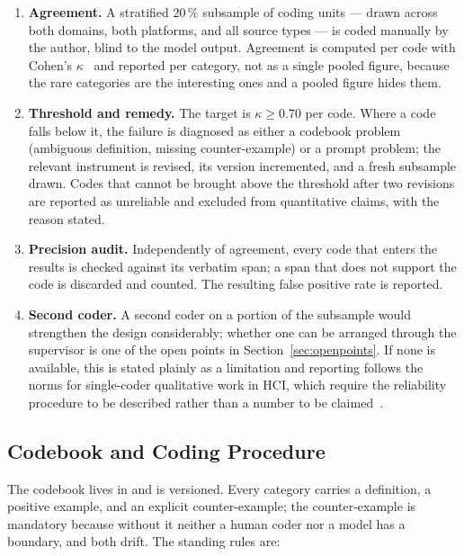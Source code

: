 \begin{enumerate}[leftmargin=*,itemsep=3pt]
  \item \textbf{Agreement.} A stratified 20\,\% subsample of coding units ---
        drawn across both domains, both platforms, and all source types --- is
        coded manually by the author, blind to the model output. Agreement is
        computed per code with Cohen's $\kappa$~\parencite{cohen1960coefficient}
        and reported per category, not as a single pooled figure, because the
        rare categories are the interesting ones and a pooled figure hides them.
  \item \textbf{Threshold and remedy.} The target is $\kappa \geq 0.70$ per
        code. Where a code falls below it, the failure is diagnosed as either a
        codebook problem (ambiguous definition, missing counter-example) or a
        prompt problem; the relevant instrument is revised, its version
        incremented, and a fresh subsample drawn. Codes that cannot be brought
        above the threshold after two revisions are reported as unreliable and
        excluded from quantitative claims, with the reason stated.
  \item \textbf{Precision audit.} Independently of agreement, every code that
        enters the results is checked against its verbatim span; a span that
        does not support the code is discarded and counted. The resulting false
        positive rate is reported.
  \item \textbf{Second coder.} A second coder on a portion of the subsample
        would strengthen the design considerably; whether one can be arranged
        through the supervisor is one of the open points in
        Section~\ref{sec:openpoints}. If none is available, this is stated
        plainly as a limitation and reporting follows the norms for
        single-coder qualitative work in HCI, which require the reliability
        procedure to be described rather than a number to be
        claimed~\parencite{mcdonald2019reliability}.
\end{enumerate}

\subsection{Codebook and Coding Procedure}

The codebook lives in  and is versioned. Every
category carries a definition, a positive example, and an explicit
counter-example; the counter-example is mandatory because without it neither a
human coder nor a model has a boundary, and both drift. The standing rules are:

